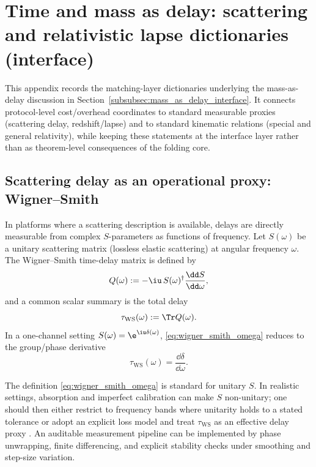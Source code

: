 \section{Time and mass as delay: scattering and relativistic lapse dictionaries (interface)}
\label{app:time_mass_delay}
\label{app:time_mass_delay_sr_gr}
\label{app:time_mass_delay_ws}

This appendix records the matching-layer dictionaries underlying the mass-as-delay discussion in Section~\ref{subsubsec:mass_as_delay_interface}.
It connects protocol-level cost/overhead coordinates to standard measurable proxies (scattering delay, redshift/lapse) and to standard kinematic relations (special and general relativity), while keeping these statements at the interface layer rather than as theorem-level consequences of the folding core.

\subsection{Scattering delay as an operational proxy: Wigner--Smith}
\label{app:wigner_smith_delay_z128}

In platforms where a scattering description is available, delays are directly measurable from complex $S$-parameters as functions of frequency.
Let $S(\omega)$ be a unitary scattering matrix (lossless elastic scattering) at angular frequency $\omega$.
The Wigner--Smith time-delay matrix is defined by \cite{Wigner1955,Smith1960}
\begin{equation}
\label{eq:wigner_smith_omega}
Q(\omega):=-\iu\,S(\omega)^\dagger\frac{\dd S}{\dd \omega},
\end{equation}
and a common scalar summary is the total delay
\begin{equation}
\label{eq:tau_ws_trace_omega}
\tau_{\mathrm{WS}}(\omega):=\Tr Q(\omega).
\end{equation}
In a one-channel setting $S(\omega)=\e^{\iu\delta(\omega)}$, \eqref{eq:wigner_smith_omega} reduces to the group/phase derivative
\begin{equation}
\label{eq:wigner_smith_one_channel}
\tau_{\mathrm{WS}}(\omega)=\frac{\dd\delta}{\dd\omega}.
\end{equation}

\begin{remark}
\label{rem:wigner_smith_calibration_losses}
The definition \eqref{eq:wigner_smith_omega} is standard for unitary $S$.
In realistic settings, absorption and imperfect calibration can make $S$ non-unitary; one should then either restrict to frequency bands where unitarity holds to a stated tolerance or adopt an explicit loss model and treat $\tau_{\mathrm{WS}}$ as an effective delay proxy \cite{Wigner1955,Smith1960}.
An auditable measurement pipeline can be implemented by phase unwrapping, finite differencing, and explicit stability checks under smoothing and step-size variation.
\end{remark}

